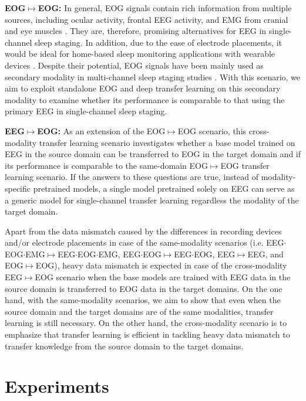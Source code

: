 \documentclass[journal,twoside,web]{ieeecolor}
\begin{document}
{\bf EOG$\mapsto$EOG:} In general, EOG signals contain rich information from multiple sources, including ocular activity, frontal EEG activity, and EMG from cranial and eye muscles \cite{Olesen2016}. They are, therefore, promising alternatives for EEG in single-channel sleep staging. In addition, due to the ease of electrode placements, it would be ideal for home-based sleep monitoring applications with wearable devices \cite{Mikkelsen2019, Sterr2018}. Despite their potential, EOG signals have been mainly used as secondary modality in multi-channel sleep staging studies \cite{Olesen2016, Liang2015}. With this scenario, we aim to exploit standalone EOG and deep transfer learning on this secondary modality to examine whether its performance is comparable to that using the primary EEG in single-channel sleep staging. 

{\bf EEG$\mapsto$EOG:} As an extension of the EOG$\mapsto$EOG scenario, this cross-modality transfer learning scenario investigates whether a base model trained on EEG in the source domain can be transferred to EOG in the target domain and if its performance is comparable to the same-domain EOG$\mapsto$EOG transfer learning scenario. If the answers to these questions are true, instead of modality-specific pretrained models, a single model pretrained solely on EEG can serve as a generic model for single-channel transfer learning regardless the modality of the target domain.

Apart from the data mismatch caused by the differences in recording devices and/or electrode placements in case of the same-modality scenarios (i.e. EEG$\cdot$EOG$\cdot$EMG$\mapsto$EEG$\cdot$EOG$\cdot$EMG, EEG$\cdot$EOG$\mapsto$EEG$\cdot$EOG, EEG$\mapsto$EEG, and EOG$\mapsto$EOG), heavy data mismatch is expected in case of the cross-modality EEG$\mapsto$EOG scenario when the base models are trained with EEG data in the source domain is transferred to EOG data in the target domains. On the one hand, with the same-modality scenarios, we aim to show that even when the source domain and the target domains are of the same modalities, transfer learning is still necessary. On the other hand, the cross-modality scenario is to emphasize that transfer learning is efficient in tackling heavy data mismatch to transfer knowledge from the source domain to the target domains.

\vspace{-0.2cm}
\section{Experiments}
\end{document}
